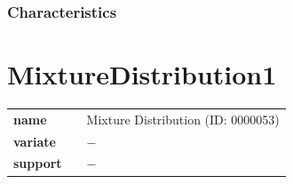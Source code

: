 \subsubsection*{Characteristics}
\smallskip
\section*{MixtureDistribution1} 

  \bigskip 

\begin{tabular}{p{2cm}cl}
\textbf{name} & & Mixture Distribution (ID: 0000053)\\ 
 
\textbf{variate} & & $-$ \\ 

\textbf{support} & & $-$
\end{tabular}

